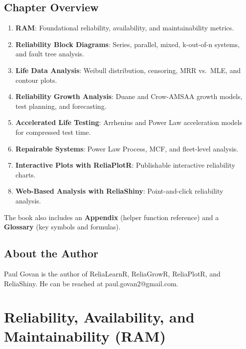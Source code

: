 \documentclass[
  letterpaper,
  DIV=11,
  numbers=noendperiod]{scrreprt}
\providecommand{\tightlist}{%
  \setlength{\itemsep}{0pt}\setlength{\parskip}{0pt}}
\begin{document}
\section*{Chapter Overview}\label{chapter-overview}


\begin{enumerate}
\def\labelenumi{\arabic{enumi}.}
\tightlist
\item
  \textbf{RAM}: Foundational reliability, availability, and
  maintainability metrics.
\item
  \textbf{Reliability Block Diagrams}: Series, parallel, mixed,
  k-out-of-n systems, and fault tree analysis.
\item
  \textbf{Life Data Analysis}: Weibull distribution, censoring, MRR
  vs.~MLE, and contour plots.
\item
  \textbf{Reliability Growth Analysis}: Duane and Crow-AMSAA growth
  models, test planning, and forecasting.
\item
  \textbf{Accelerated Life Testing}: Arrhenius and Power Law
  acceleration models for compressed test time.
\item
  \textbf{Repairable Systems}: Power Law Process, MCF, and fleet-level
  analysis.
\item
  \textbf{Interactive Plots with ReliaPlotR}: Publishable interactive
  reliability charts.
\item
  \textbf{Web-Based Analysis with ReliaShiny}: Point-and-click
  reliability analysis.
\end{enumerate}

The book also includes an \textbf{Appendix} (helper function reference)
and a \textbf{Glossary} (key symbols and formulas).

\section*{About the Author}\label{about-the-author}


Paul Govan is the author of ReliaLearnR, ReliaGrowR, ReliaPlotR, and
ReliaShiny. He can be reached at paul.govan2@gmail.com.


\chapter{Reliability, Availability, and Maintainability
(RAM)}\label{sec-ram}
\end{document}
